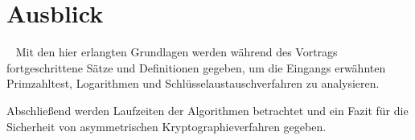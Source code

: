 \section*{Ausblick}~\label{Kapitel Fazit}
	Mit den hier erlangten Grundlagen werden während des Vortrags fortgeschrittene Sätze und Definitionen gegeben, um die Eingangs erwähnten Primzahltest, Logarithmen und Schlüsselaustauschverfahren zu analysieren.

	Abschließend werden Laufzeiten der Algorithmen betrachtet und ein Fazit für die Sicherheit von asymmetrischen Kryptographieverfahren gegeben.